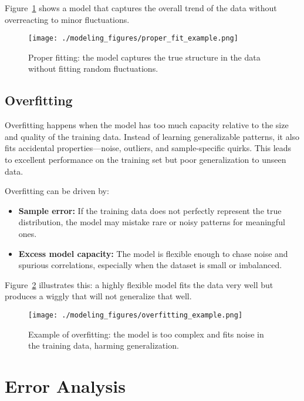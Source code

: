 \documentclass[12pt,openany]{book}
\begin{document}
Figure~\ref{fig:proper-fitting-example} shows a model that captures the overall trend of the data without overreacting to minor fluctuations.

\begin{figure}[H]
    \centering
    \texttt{[image: ./modeling\_figures/proper\_fit\_example.png]}
    \caption{Proper fitting: the model captures the true structure in the data without fitting random fluctuations.}
    \label{fig:proper-fitting-example}
\end{figure}


\subsection{Overfitting} \label{subsec:overfitting}

Overfitting happens when the model has too much capacity relative to the size and quality of the training data. Instead of learning generalizable patterns, it also fits accidental properties—noise, outliers, and sample-specific quirks. This leads to excellent performance on the training set but poor generalization to unseen data. \newline

Overfitting can be driven by:
\begin{itemize}
    \item \textbf{Sample error:} If the training data does not perfectly represent the true distribution, the model may mistake rare or noisy patterns for meaningful ones.
    \item \textbf{Excess model capacity:} The model is flexible enough to chase noise and spurious correlations, especially when the dataset is small or imbalanced.
\end{itemize}

Figure~\ref{fig:overfitting-example} illustrates this: a highly flexible model fits the data very well but produces a wiggly that will not generalize that well.

\begin{figure}[H]
    \centering
    \texttt{[image: ./modeling\_figures/overfitting\_example.png]}
    \caption{Example of overfitting: the model is too complex and fits noise in the training data, harming generalization.}
    \label{fig:overfitting-example}
\end{figure}



\section{Error Analysis} \label{sec:error_analysis}
\end{document}
